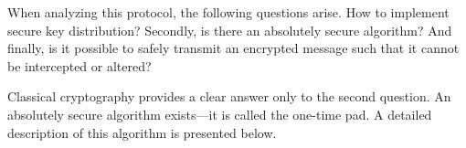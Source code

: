 When analyzing this protocol, the following questions arise. How to implement secure key distribution? Secondly, is there an absolutely secure algorithm? And finally, is it possible to safely transmit an encrypted message such that it cannot be intercepted or altered?

Classical cryptography provides a clear answer only to the second question. An absolutely secure algorithm exists—it is called the one-time pad. A detailed description of this algorithm is presented below.
